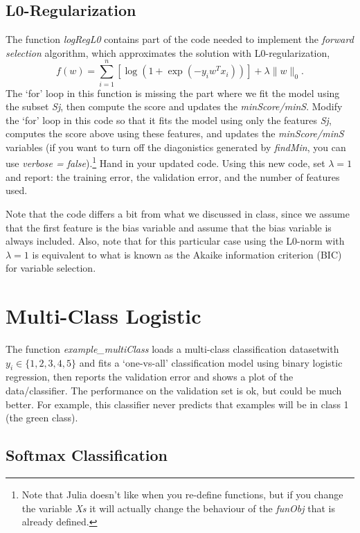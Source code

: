\documentclass{article}
\def\blu#1{{\color{blu}#1}}
\def\norm#1{\|#1\|}
\begin{document}
\subsection{L0-Regularization}

The function \emph{logRegL0} contains part of the code needed to implement the \emph{forward selection} algorithm, which approximates the solution with L0-regularization,
\[
f(w) =  \sum_{i=1}^n \left[\log(1+\exp(-y_iw^Tx_i))\right] + \lambda\norm{w}_0.
\]
The `for' loop in this function is missing the part where we fit the model using the subset \emph{Sj}, then compute the score and updates the \emph{minScore/minS}. Modify the `for' loop in this code so that it fits the model using only the features \emph{Sj}, computes the score above using these features, and updates the \emph{minScore/minS} variables (if you want to turn off the diagonistics generated by \emph{findMin}, you can use \emph{verbose = false}).\footnote{Note that Julia doesn't like when you re-define functions, but if you change the variable \emph{Xs} it will actually change the behaviour of the \emph{funObj} that is already defined.}
\blu{Hand in your updated code. Using this new code, set $\lambda = 1$ and report: the training error, the validation error, and the number of features used.}

Note that the code differs a bit from what we discussed in class, since we assume that the first feature is the bias variable and assume that the bias variable is always included. Also, note that for this particular case using the L0-norm with $\lambda=1$ is equivalent to what is known as the Akaike information criterion (BIC) for variable selection.



\section{Multi-Class Logistic}

The function \emph{example\_multiClass} loads a multi-class classification datasetwith $y_i \in \{1,2,3,4,5\}$ and fits a `one-vs-all' classification model using binary logistic regression, then reports the validation error and shows a plot of the data/classifier. The performance on the validation set is ok, but could be much better. For example, this classifier never  predicts that examples will be in class 1 (the green class).

\subsection{Softmax Classification}
\end{document}
